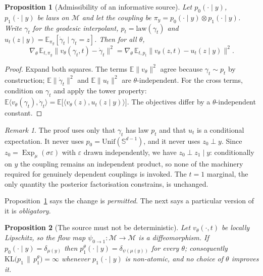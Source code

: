 \documentclass[11pt,a4paper]{article}
\newcommand{\Sph}[1]{\mathbb{S}^{#1}}
\newcommand{\Exp}{\operatorname{Exp}}
\newcommand{\E}{\mathbb{E}}
\newcommand{\Unif}{\mathrm{Unif}}
\newcommand{\KL}{\mathrm{KL}}
\theoremstyle{plain}
\newtheorem{proposition}{Proposition}
\theoremstyle{remark}
\newtheorem*{remark}{Remark}
\begin{document}
\begin{proposition}[Admissibility of an informative source]
\label{prop:admissible}
Let $p_0(\cdot\mid y)$, $p_1(\cdot\mid y)$ be laws on $\mathcal{M}$ and let the
coupling be $\pi_y = p_0(\cdot\mid y)\otimes p_1(\cdot\mid y)$. Write
$\gamma_t$ for the geodesic interpolant, $p_t=\mathrm{law}(\gamma_t)$ and
$u_t(z\mid y)=\E_{\pi_y}[\dot\gamma_t\mid\gamma_t=z]$. Then for all $\theta$,
\begin{equation}
\nabla_\theta\,\E_{t,\pi_y}\big\lVert v_\theta(\gamma_t,t)-\dot\gamma_t\big\rVert^2
=\nabla_\theta\,\E_{t,p_t}\big\lVert v_\theta(z,t)-u_t(z\mid y)\big\rVert^2 .
\end{equation}
\end{proposition}

\begin{proof}
Expand both squares. The terms $\E\lVert v_\theta\rVert^2$ agree because
$\gamma_t\sim p_t$ by construction; $\E\lVert\dot\gamma_t\rVert^2$ and
$\E\lVert u_t\rVert^2$ are $\theta$-independent. For the cross terms, condition
on $\gamma_t$ and apply the tower property:
$\E\langle v_\theta(\gamma_t),\dot\gamma_t\rangle
=\E\big[\langle v_\theta(z),u_t(z\mid y)\rangle\big]$.
The objectives differ by a $\theta$-independent constant.
\end{proof}

\begin{remark}
The proof uses only that $\gamma_t$ has law $p_t$ and that $u_t$ is a conditional
expectation. It never uses $p_0=\Unif(\Sph{d-1})$, and it never uses
$z_0\perp y$. Since $z_0=\Exp_\mu(\sigma\varepsilon)$ with $\varepsilon$ drawn
independently, we have $z_0\perp z_1\mid y$: conditionally on $y$ the coupling
remains an independent product, so none of the machinery required for genuinely
dependent couplings is invoked. The $t\!=\!1$ marginal, the only quantity the
posterior factorisation constrains, is unchanged.
\end{remark}

\noindent Proposition~\ref{prop:admissible} says the change is \emph{permitted}.
The next says a particular version of it is \emph{obligatory}.

\begin{proposition}[The source must not be deterministic]
\label{prop:dirac}
Let $v_\theta(\cdot,t)$ be locally Lipschitz, so the flow map
$\psi_{0\to1}:\mathcal{M}\to\mathcal{M}$ is a diffeomorphism. If
$p_0(\cdot\mid y)=\delta_{\mu(y)}$ then $p_1^\theta(\cdot\mid y)=
\delta_{\psi(\mu(y))}$ for every $\theta$; consequently
$\KL\big(p_1\,\|\,p_1^\theta\big)=\infty$ whenever $p_1(\cdot\mid y)$ is
non-atomic, and no choice of $\theta$ improves it.
\end{proposition}
\end{document}
